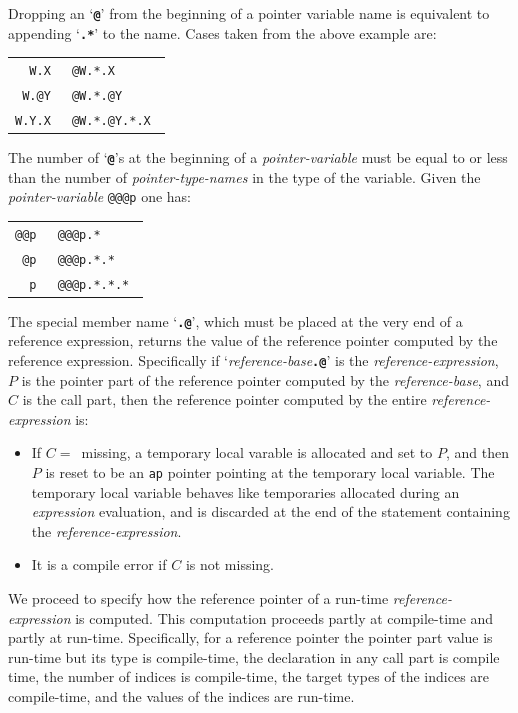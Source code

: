 \documentclass[12pt]{article}
\newcommand{\TT}[1]{{\tt \bfseries #1}}
\begin{document}
Dropping an `\TT{@}' from the beginning of a pointer variable name
is equivalent to appending `\TT{.*}' to the name.  Cases taken
from the above example are:
\begin{center}
\begin{tabular}{r@{~~is equivalent to~~}l}
\tt W.X & \tt @W.*.X \\
\tt W.@Y & \tt @W.*.@Y \\
\tt W.Y.X & \tt @W.*.@Y.*.X \\
\end{tabular}
\end{center}

The number of `\TT{@}'s at the beginning of a {\em pointer-variable}
must be equal to or less than
the number of {\em pointer-type-names} in the type of
the variable.  Given the {\em pointer-variable} {\tt @@@p}
one has:
\begin{center}
\begin{tabular}{r@{~~is equivalent to~~}l}
\tt @@p & \tt @@@p.* \\
\tt @p & \tt @@@p.*.* \\
\tt p & \tt @@@p.*.*.* \\
\end{tabular}
\end{center}

The special member name `\TT{.@}', which must be placed at the very
end of a reference expression, returns the value of the reference pointer
computed by the reference
expression.  Specifically if `{\em reference-base}\TT{.@}' is
the {\em reference-expression}, $P$ is the pointer part of the
reference pointer computed by the {\em reference-base}, and
$C$ is the call part, then the reference pointer computed by
the entire {\em reference-expression} is:
\begin{itemize}
\item If $C=$~missing, a temporary local varable is allocated and set to $P$,
and then $P$ is reset to be an {\tt ap} pointer pointing at the
temporary local variable.  The temporary local variable behaves like
temporaries allocated during an {\em expression} evaluation, and is
discarded at the end of the statement containing the {\em reference-expression}.
\item It is a compile error if $C$ is not missing.
\end{itemize}

We proceed to specify how the reference pointer of a run-time
{\em reference-expression} is computed.
This computation proceeds partly at compile-time and partly at
run-time.  Specifically, for a reference pointer the pointer part
value is run-time but its type is compile-time,
the declaration in any call part is compile time,
the number of indices is compile-time, the target
types of the indices are compile-time, and the values of the indices
are run-time.
\end{document}
